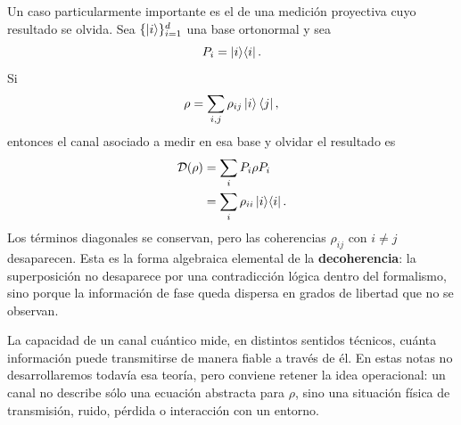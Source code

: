 \documentclass[../main.tex]{subfiles}
\begin{document}
Un caso particularmente importante es el de una medición proyectiva cuyo resultado se olvida. Sea $\{\ket{i}\}_{i=1}^{d}$ una base ortonormal y sea
\begin{equation*}
    P_i=\ket{i}\!\bra{i}.
\end{equation*}
Si
\begin{equation*}
    \rho=\sum_{i,j}\rho_{ij}\ket{i}\bra{j},
\end{equation*}
entonces el canal asociado a medir en esa base y olvidar el resultado es
\begin{align*}
    \mathcal{D}(\rho)
    &=\sum_i P_i\rho P_i\\
    &=\sum_i\rho_{ii}\ket{i}\!\bra{i}.
\end{align*}
Los términos diagonales se conservan, pero las coherencias $\rho_{ij}$ con $i\neq j$ desaparecen. Esta es la forma algebraica elemental de la \textbf{decoherencia}: la superposición no desaparece por una contradicción lógica dentro del formalismo, sino porque la información de fase queda dispersa en grados de libertad que no se observan.

\begin{observacion}
La capacidad de un canal cuántico mide, en distintos sentidos técnicos, cuánta información puede transmitirse de manera fiable a través de él. En estas notas no desarrollaremos todavía esa teoría, pero conviene retener la idea operacional: un canal no describe sólo una ecuación abstracta para $\rho$, sino una situación física de transmisión, ruido, pérdida o interacción con un entorno.
\end{observacion}

\newpage
\end{document}
